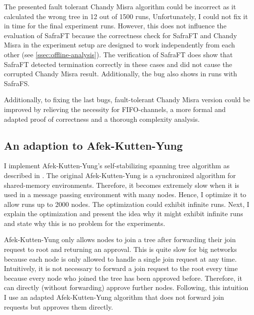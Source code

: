 The presented fault tolerant Chandy Misra algorithm could be incorrect as it calculated the wrong tree in 12 out of 1500 runs,
Unfortunately, I could not fix it in time for the final experiment runs.
However, this does not influence the evaluation of SafraFT because the correctness check for SafraFT and Chandy Misra in the experiment setup are designed to work independently from each other (see \cref{ssec:offline-analysis}).
The verification of SafraFT does show that SafraFT detected termination correctly in these cases and did not cause the corrupted Chandy Misra result.
Additionally, the bug also shows in runs with SafraFS.

Additionally, to fixing the last bugs, fault-tolerant Chandy Misra version could be improved by relieving the necessity for FIFO-channels, a more formal and adapted proof of correctness and a thorough complexity analysis.

\subsection{An adaption to Afek-Kutten-Yung}
I implement Afek-Kutten-Yung's self-stabilizing spanning tree algorithm as described in \cite[page 183ff]{fokkink:2018}.
The original Afek-Kutten-Yung is a synchronized algorithm for shared-memory environments.
Therefore, it becomes extremely slow when it is used in a message passing environment with many nodes.
Hence, I optimize it to allow runs up to 2000 nodes.
The optimization could exhibit infinite runs.
Next, I explain the optimization and present the idea why it might exhibit infinite runs and state why this is no problem for the experiments.

Afek-Kutten-Yung only allows nodes to join a tree after forwarding their join request to root and returning an approval.
This is quite slow for big networks because each node is only allowed to handle a single join request at any time.
Intuitively, it is not necessary to forward a join request to the root every time because every node who joined the tree has been approved before.
Therefore, it can directly (without forwarding) approve further nodes.
Following, this intuition I use an adapted Afek-Kutten-Yung algorithm that does not forward join requests but approves them directly.

